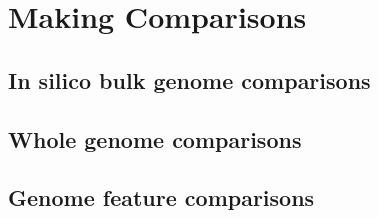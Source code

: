 \section{Making Comparisons}

\subsection{In silico bulk genome comparisons}

\subsection{Whole genome comparisons}

\subsection{Genome feature comparisons}





